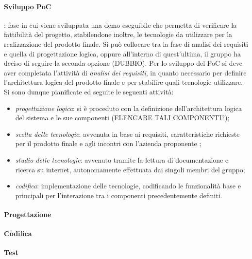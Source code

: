 \paragraph{Sviluppo PoC}: fase in cui viene sviluppata una demo eseguibile che permetta di verificare la fattibilità del progetto, stabilendone inoltre, le tecnologie da utilizzare per la realizzazione del prodotto finale. \newline
Si può collocare tra la fase di analisi dei requisiti e quella di progettazione logica, oppure all'interno di quest'ultima, il gruppo ha deciso di seguire la seconda opzione (DUBBIO). \newline %
Per lo sviluppo del PoC si deve aver completata l'attività di \textit{analisi dei requisiti}, in quanto necessario per definire l'architettura logica del prodotto finale e per stabilire quali tecnologie utilizzare. \newline
Si sono dunque pianificate ed seguite le seguenti attività:
\begin{itemize}
    \item \textit{progettazione logica}: si è proceduto con la definizione dell'architettura logica del sistema e le sue componenti (ELENCARE TALI COMPONENTI?);
    \item \textit{scelta delle tecnologie}: avvenuta in base ai requisiti, caratteristiche richieste per il prodotto finale e agli incontri con l'azienda proponente \companyName;
    \item \textit{studio delle tecnologie}: avvenuto tramite la lettura di documentazione e ricerca su internet, autonomamente effettuata dai singoli membri del gruppo;
    \item \textit{codifica}: implementazione delle tecnologie, codificando le funzionalità base e principali per l'interazione tra i componenti precedentemente definiti.
\end{itemize}

\paragraph{Progettazione}

\paragraph{Codifica}

\paragraph{Test}


